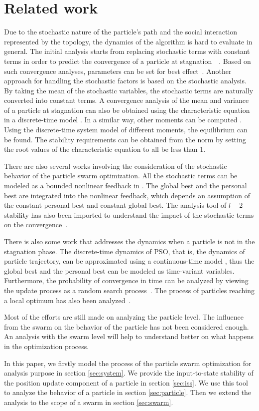 \section{Related work}
\label{sec:rel_work}

Due to the stochastic nature of the particle's path and the social interaction represented by the topology, the dynamics of the algorithm is hard to evaluate in general.
The initial analysis starts from replacing stochastic terms with constant terms in order to predict the convergence of a particle at stagnation~\cite{985692}~\cite{4424687}.
Based on such convergence analyses, parameters can be set for best effect~\cite{Trelea2003317}.
Another approach for handling the stochastic factors is based on the stochastic analysis.
By taking the mean of the stochastic variables, the stochastic terms are naturally converted into
constant terms.
A convergence analysis of the mean and variance of a particle at stagnation can also be obtained using the characteristic equation in a discrete-time model 
\cite{Jiang20078}.
In a similar way, 
other moments can be computed
\cite{5175367,Poli:2007:EAS:1276958.1276977,Poli:2008:DSS:1384929.1384944}.
Using the discrete-time system model of different moments, the equilibrium can be found.
The stability requirements can be obtained from the norm by setting the root values of the characteristic equation to all be less than 1.

There are also several works involving the consideration of the stochastic behavior of the particle swarm optimization.
All the stochastic terms can be modeled as a bounded nonlinear feedback in \cite{1637686}.
The global best and the personal best are integrated into the nonlinear feedback, which depends an assumption of the constant personal best and constant global best.
The analysis tool of $ l-2 $ stability has also been imported to understand the impact of the stochastic terms on the convergence~\cite{5160341}.

There is also some work that addresses the dynamics when a particle is not in the stagnation phase.
The discrete-time dynamics of PSO, that is, the dynamics of particle trajectory, can be approximated
using a continuous-time model
\cite{5675669}, thus the global best and the personal best can be modeled as time-variant variables.
Furthermore, the probability of convergence in time can be analyzed by viewing the update process as a random search process~\cite{vandenBergh:2010:CPP:2010420.2010421}.
The process of particles reaching a local optimum has also been analyzed~\cite{Schmitt:2013:PSO:2463372.2463563}.

Most of the efforts are still made on analyzing the particle level.
The influence from the swarm on the behavior of the particle has not been considered enough.
An analysis with the swarm level will help to understand better on what happens in the optimization process.

In this paper, we firstly model the process of the particle swarm optimization for analysis purpose in section \ref{sec:system}.
We provide the input-to-state stability of the position update component of a particle in section \ref{sec:iss}.
We use this tool to analyze the behavior of a particle in section \ref{sec:particle}.
Then we extend the analysis to the scope of a swarm in section \ref{sec:swarm}.
